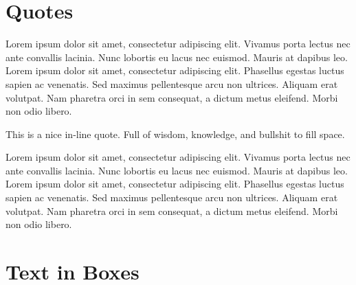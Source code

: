 \documentclass[12pt, a4paper, twopage]{scrartcl}
\begin{document}











\section{Quotes}

Lorem ipsum dolor sit amet, consectetur adipiscing elit. Vivamus porta lectus nec ante convallis lacinia. Nunc lobortis eu lacus nec euismod. Mauris at dapibus leo. Lorem ipsum dolor sit amet, consectetur adipiscing elit. Phasellus egestas luctus sapien ac venenatis. Sed maximus pellentesque arcu non ultrices. Aliquam erat volutpat. Nam pharetra orci in sem consequat, a dictum metus eleifend. Morbi non odio libero.


\begin{displayquote} %
	This is a nice in-line quote. Full of wisdom, knowledge, and bullshit to fill space.
\end{displayquote}


Lorem ipsum dolor sit amet, consectetur adipiscing elit. Vivamus porta lectus nec ante convallis lacinia. Nunc lobortis eu lacus nec euismod. Mauris at dapibus leo. Lorem ipsum dolor sit amet, consectetur adipiscing elit. Phasellus egestas luctus sapien ac venenatis. Sed maximus pellentesque arcu non ultrices. Aliquam erat volutpat. Nam pharetra orci in sem consequat, a dictum metus eleifend. Morbi non odio libero.













\section{Text in Boxes}
\end{document}
